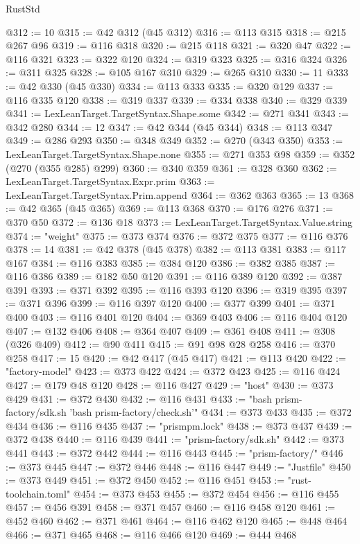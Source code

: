 \begin{lexlean}{RustStd}
\begin{coremodule}
@312 := 10
@315 := @42 @312 (@45 @312)
@316 := @113 @315
@318 := @215 @267 @96
@319 := @116 @318
@320 := @215 @118
@321 := @320 @47
@322 := @116 @321
@323 := @322 @120
@324 := @319 @323
@325 := @316 @324
@326 := @311 @325
@328 := @105 @167 @310
@329 := @265 @310
@330 := 11
@333 := @42 @330 (@45 @330)
@334 := @113 @333
@335 := @320 @129
@337 := @116 @335 @120
@338 := @319 @337
@339 := @334 @338
@340 := @329 @339
@341 := LexLeanTarget.TargetSyntax.Shape.some
@342 := @271 @341
@343 := @342 @280
@344 := 12
@347 := @42 @344 (@45 @344)
@348 := @113 @347
@349 := @286 @293
@350 := @348 @349
@352 := @270 (@343 @350)
@353 := LexLeanTarget.TargetSyntax.Shape.none
@355 := @271 @353 @98
@359 := @352 (@270 (@355 @285) @299)
@360 := @340 @359
@361 := @328 @360
@362 := LexLeanTarget.TargetSyntax.Expr.prim
@363 := LexLeanTarget.TargetSyntax.Prim.append
@364 := @362 @363
@365 := 13
@368 := @42 @365 (@45 @365)
@369 := @113 @368
@370 := @176 @276
@371 := @370 @50
@372 := @136 @18
@373 := LexLeanTarget.TargetSyntax.Value.string
@374 := "weight"
@375 := @373 @374
@376 := @372 @375
@377 := @116 @376
@378 := 14
@381 := @42 @378 (@45 @378)
@382 := @113 @381
@383 := @117 @167
@384 := @116 @383
@385 := @384 @120
@386 := @382 @385
@387 := @116 @386
@389 := @182 @50 @120
@391 := @116 @389 @120
@392 := @387 @391
@393 := @371 @392
@395 := @116 @393 @120
@396 := @319 @395
@397 := @371 @396
@399 := @116 @397 @120
@400 := @377 @399
@401 := @371 @400
@403 := @116 @401 @120
@404 := @369 @403
@406 := @116 @404 @120
@407 := @132 @406
@408 := @364 @407
@409 := @361 @408
@411 := @308 (@326 @409)
@412 := @90 @411
@415 := @91 @98 @28 @258
@416 := @370 @258
@417 := 15
@420 := @42 @417 (@45 @417)
@421 := @113 @420
@422 := "factory-model"
@423 := @373 @422
@424 := @372 @423
@425 := @116 @424
@427 := @179 @48 @120
@428 := @116 @427
@429 := "host"
@430 := @373 @429
@431 := @372 @430
@432 := @116 @431
@433 := "bash prism-factory/sdk.sh 'bash prism-factory/check.sh'"
@434 := @373 @433
@435 := @372 @434
@436 := @116 @435
@437 := "prismpm.lock"
@438 := @373 @437
@439 := @372 @438
@440 := @116 @439
@441 := "prism-factory/sdk.sh"
@442 := @373 @441
@443 := @372 @442
@444 := @116 @443
@445 := "prism-factory/"
@446 := @373 @445
@447 := @372 @446
@448 := @116 @447
@449 := "Justfile"
@450 := @373 @449
@451 := @372 @450
@452 := @116 @451
@453 := "rust-toolchain.toml"
@454 := @373 @453
@455 := @372 @454
@456 := @116 @455
@457 := @456 @391
@458 := @371 @457
@460 := @116 @458 @120
@461 := @452 @460
@462 := @371 @461
@464 := @116 @462 @120
@465 := @448 @464
@466 := @371 @465
@468 := @116 @466 @120
@469 := @444 @468

\end{coremodule}
\end{lexlean}
